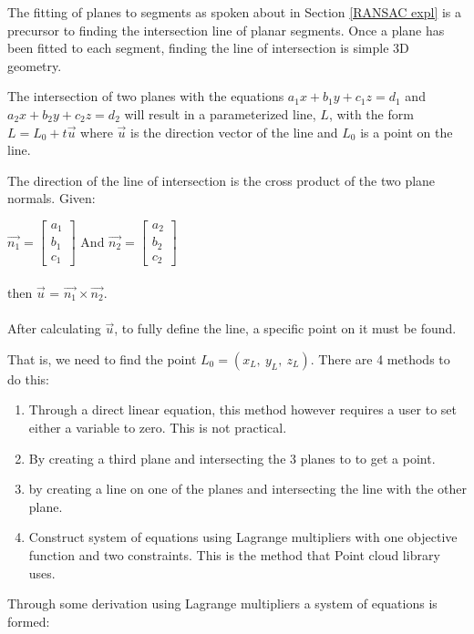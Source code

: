 	The fitting of planes to segments as spoken about in Section \ref{RANSAC expl} is a precursor to finding the intersection line of planar segments. Once a plane has been fitted to each segment, finding the line of intersection is simple 3D geometry.
	
	The intersection of two planes with the equations $a_1x + b_1y + c_1z = d_1$ and $a_2x + b_2y + c_2z = d_2$ will result in a parameterized line, $L$, with the form $L = L_0 + t\vec{u}$ where $\vec{u}$ is the direction vector of the line and $L_0$ is a point on the line.
	
	The direction of the line of intersection is the cross product of the two plane normals. Given:
	
	$\vec{n_1} = \begin{bmatrix}a_1\\b_1\\c_1\end{bmatrix}$  And $\vec{n_2} = \begin{bmatrix}a_2\\b_2\\c_2\end{bmatrix}$\\
	\\
	then $\vec{u}$  =  $\vec{n_1} \times \vec{n_2}  $.\\
	\\
	After calculating $\vec{u}$, to fully define the line, a specific point on it must be found.
	
	That is, we need to find the point $L_0 = (x_L,\:y_L,\:z_L)$. There are 4 methods to do this:
	\begin{enumerate}
	\item Through a direct linear equation, this method however requires a user to set either a variable to zero. This is not practical.
	
	\item By creating a third plane and intersecting the 3 planes to to get a point.
	
	\item by creating a line on one of the planes and intersecting the line with the other plane. 
	
	\item Construct system of equations using Lagrange multipliers with one objective function and two constraints. This is the method that Point cloud library uses.
	\end{enumerate}
	
	Through some derivation using Lagrange multipliers a system of equations is formed:
	

